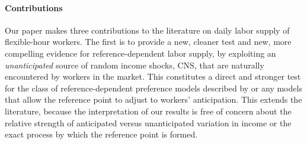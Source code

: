 \documentclass[reviewmode,AEJ]{AEA}
\begin{document}

\paragraph{Contributions} 
Our paper makes three contributions to the literature on daily labor supply 
of flexible-hour workers. The first is to provide a new, cleaner test 
and new, more compelling evidence for reference-dependent labor supply, 
by exploiting an \textit{unanticipated} source of random income shocks, CNS, that are naturally encountered by workers
in the market. This constitutes a direct and stronger test for the
class of reference-dependent preference models described by \citet{kHoszegi2006model} or any models that 
allow the reference point to adjust to workers' anticipation. This extends the literature, because the
interpretation of our results is free of concern about the relative strength of anticipated versus 
unanticipated variation in income or the exact process by which the reference point is formed.
\end{document}
